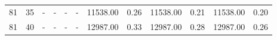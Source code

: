 \begin{table}
\begin{tabular}{@{}rrrrrrrrrrrr@{}}
81                                                                               & 35                                                                                    & -                                                                      & -                                                                  & -                                                                      & -                                                                 & 11538.00                                                                    & 0.26                                                                   & 11538.00                                                                    & 0.21                                                                   & 11538.00                                                                    & 0.20                                                                   \\
81                                                                               & 40                                                                                    & -                                                                      & -                                                                  & -                                                                      & -                                                                 & 12987.00                                                                    & 0.33                                                                   & 12987.00                                                                    & 0.28                                                                   & 12987.00                                                                    & 0.26                                                                   \\ \bottomrule
\end{tabular}
\end{table}